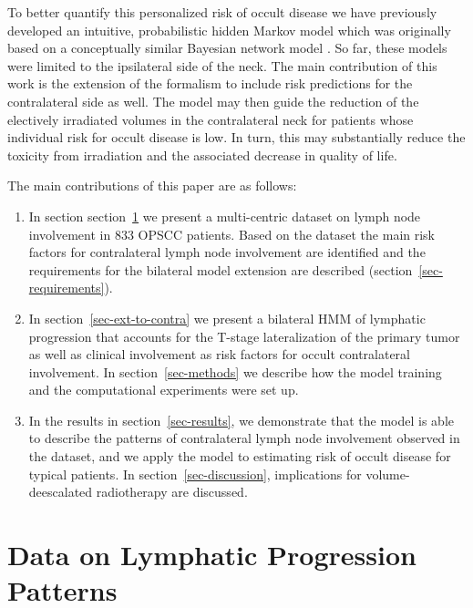 \documentclass[
  sn-mathphys-num,
]{sn-jnl}
\begin{document}
To better quantify this personalized risk of occult disease we have
previously developed an intuitive, probabilistic hidden Markov model
\citep{ludwig_hidden_2021, ludwig_modelling_2023} which was originally
based on a conceptually similar Bayesian network model
\citep{pouymayou_bayesian_2019}. So far, these models were limited to
the ipsilateral side of the neck. The main contribution of this work is
the extension of the formalism to include risk predictions for the
contralateral side as well. The model may then guide the reduction of
the electively irradiated volumes in the contralateral neck for patients
whose individual risk for occult disease is low. In turn, this may
substantially reduce the toxicity from irradiation and the associated
decrease in quality of life.

The main contributions of this paper are as follows:

\begin{enumerate}
\def\labelenumi{\arabic{enumi}.}
\item
  In section section~\ref{sec-data} we present a multi-centric dataset
  on lymph node involvement in 833 OPSCC patients. Based on the dataset
  the main risk factors for contralateral lymph node involvement are
  identified and the requirements for the bilateral model extension are
  described (section~\ref{sec-requirements}).
\item
  In section~\ref{sec-ext-to-contra} we present a bilateral HMM of
  lymphatic progression that accounts for the T-stage lateralization of
  the primary tumor as well as clinical involvement as risk factors for
  occult contralateral involvement. In section~\ref{sec-methods} we
  describe how the model training and the computational experiments were
  set up.
\item
  In the results in section~\ref{sec-results}, we demonstrate that the
  model is able to describe the patterns of contralateral lymph node
  involvement observed in the dataset, and we apply the model to
  estimating risk of occult disease for typical patients. In
  section~\ref{sec-discussion}, implications for volume-deescalated
  radiotherapy are discussed.
\end{enumerate}

\section{Data on Lymphatic Progression Patterns}\label{sec-data}
\end{document}
